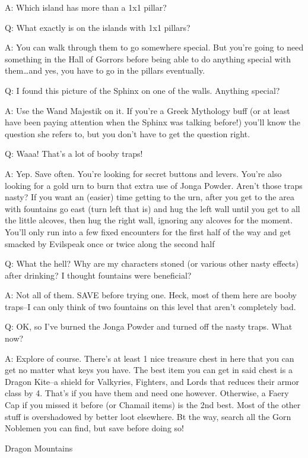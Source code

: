 \documentclass[12pt]{article}
\begin{document}
A: Which island has more than a 1x1 pillar?

Q: What exactly is on the islands with 1x1 pillars?

A: You can walk through them to go somewhere special. But you're going
to need something in the Hall of Gorrors before being able to do
anything special with them\ldots{}and yes, you have to go in the pillars
eventually.

Q: I found this picture of the Sphinx on one of the walls. Anything
special?

A: Use the Wand Majestik on it. If you're a Greek Mythology buff (or at
least have been paying attention when the Sphinx was talking before!)
you'll know the question she refers to, but you don't have to get the
question right.

Q: Waaa! That's a lot of booby traps!

A: Yep. Save often. You're looking for secret buttons and levers. You're
also looking for a gold urn to burn that extra use of Jonga Powder.
Aren't those traps nasty? If you want an (easier) time getting to the
urn, after you get to the area with fountains go east (turn left that
is) and hug the left wall until you get to all the little alcoves, then
hug the right wall, ignoring any alcoves for the moment. You'll only run
into a few fixed encounters for the first half of the way and get
smacked by Evilspeak once or twice along the second half

Q: What the hell? Why are my characters stoned (or various other nasty
effects) after drinking? I thought fountains were beneficial?

A: Not all of them. SAVE before trying one. Heck, most of them here are
booby traps--I can only think of two fountains on this level that aren't
completely bad.

Q: OK, so I've burned the Jonga Powder and turned off the nasty traps.
What now?

A: Explore of course. There's at least 1 nice treasure chest in here
that you can get no matter what keys you have. The best item you can get
in said chest is a Dragon Kite--a shield for Valkyries, Fighters, and
Lords that reduces their armor class by 4. That's if you have them and
need one however. Otherwise, a Faery Cap if you missed it before (or
Chamail items) is the 2nd best. Most of the other stuff is overshadowed
by better loot elsewhere. Bt the way, search all the Gorn Noblemen you
can find, but save before doing so!

Dragon Mountains
\end{document}
